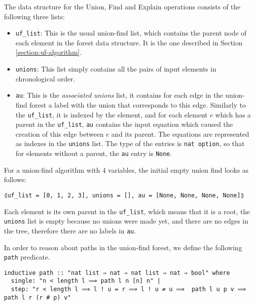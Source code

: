 The data structure for the Union, Find and Explain operations consists of the following three lists:

\begin{itemize}
	\item \lstinline{uf_list}: This is the usual union-find list, which contains the parent node of each element in the forest data structure. It is the one described in Section \ref{section:uf-algorithm}.

	\item \lstinline{unions}: This list simply contains all the pairs of input elements in chronological order.

	\item \lstinline{au}: This is the \emph{associated unions} list, it contains for each edge in the union-find forest a label with the union that corresponds to this edge. Similarly to the \lstinline{uf_list}, it is indexed by the element, and for each element $e$ which has a parent in the \lstinline{uf_list}, \lstinline{au} contains the input equation which caused the creation of this edge between $e$ and its parent. The equations are represented as indexes in the \lstinline{unions} list. The type of the entries is \lstinline{nat option}, so that for elements without a parent, the \lstinline{au} entry is \lstinline{None}.
\end{itemize}

\begin{exmp}\label{empty_ufe}
For a union-find algorithm with 4 variables, the initial empty union find looks as follows:
\begin{lstlisting}
⦇uf_list = [0, 1, 2, 3], unions = [], au = [None, None, None, None]⦈
\end{lstlisting}
Each element is its own parent in the \lstinline{uf_list}, which means that it is a root, the \lstinline{unions} list is empty because no unions were made yet, and there are no edges in the tree, therefore there are no labels in \lstinline{au}.
\end{exmp}

In order to reason about paths in the union-find forest, we define the following \lstinline{path} predicate.

\begin{lstlisting}
inductive path :: "nat list ⇒ nat ⇒ nat list ⇒ nat ⇒ bool" where
  single: "n < length l ⟹ path l n [n] n" |
  step: "r < length l ⟹ l ! u = r ⟹ l ! u ≠ u ⟹  path l u p v ⟹ path l r (r # p) v"
\end{lstlisting}

